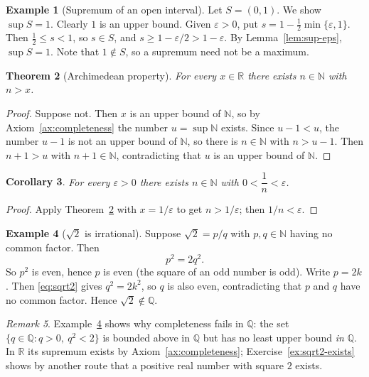 \documentclass[11pt,a4paper]{book}
\newcommand{\N}{\mathbb{N}}
\newcommand{\Q}{\mathbb{Q}}
\newcommand{\R}{\mathbb{R}}
\numberwithin{equation}{section}          %
\theoremstyle{plain}
\newtheorem{theorem}{Theorem}[section]    %
\newtheorem{corollary}[theorem]{Corollary}
\theoremstyle{definition}
\newtheorem{example}[theorem]{Example}
\theoremstyle{remark}
\newtheorem{remark}[theorem]{Remark}
\begin{document}
\begin{example}[Supremum of an open interval]\label{ex:sup-interval}
Let $S=(0,1)$. We show $\sup S=1$. Clearly $1$ is an upper bound. Given $\varepsilon>0$, put $s=1-\tfrac12\min\{\varepsilon,1\}$. Then $\tfrac12\le s<1$, so $s\in S$, and $s\ge 1-\varepsilon/2>1-\varepsilon$. By Lemma~\ref{lem:sup-eps}, $\sup S=1$. Note that $1\notin S$, so a supremum need not be a maximum.
\end{example}

\begin{theorem}[Archimedean property]\label{thm:archimedean}
For every $x\in\R$ there exists $n\in\N$ with $n>x$.
\end{theorem}

\begin{proof}
Suppose not. Then $x$ is an upper bound of $\N$, so by Axiom~\ref{ax:completeness} the number $u=\sup\N$ exists. Since $u-1<u$, the number $u-1$ is not an upper bound of $\N$, so there is $n\in\N$ with $n>u-1$. Then $n+1>u$ with $n+1\in\N$, contradicting that $u$ is an upper bound of $\N$.
\end{proof}

\begin{corollary}\label{cor:one-over-n}
For every $\varepsilon>0$ there exists $n\in\N$ with $0<\dfrac1n<\varepsilon$.
\end{corollary}

\begin{proof}
Apply Theorem~\ref{thm:archimedean} with $x=1/\varepsilon$ to get $n>1/\varepsilon$; then $1/n<\varepsilon$.
\end{proof}

\begin{example}[$\sqrt2$ is irrational]\label{ex:sqrt2}
Suppose $\sqrt2=p/q$ with $p,q\in\N$ having no common factor. Then
\begin{equation}\label{eq:sqrt2}
    p^2=2q^2 .
\end{equation}
So $p^2$ is even, hence $p$ is even (the square of an odd number is odd). Write $p=2k$. Then \eqref{eq:sqrt2} gives $q^2=2k^2$, so $q$ is also even, contradicting that $p$ and $q$ have no common factor. Hence $\sqrt2\notin\Q$.
\end{example}

\begin{remark}
Example~\ref{ex:sqrt2} shows why completeness fails in $\Q$: the set $\{q\in\Q: q>0,\ q^2<2\}$ is bounded above in $\Q$ but has no least upper bound \emph{in} $\Q$. In $\R$ its supremum exists by Axiom~\ref{ax:completeness}; Exercise~\ref{ex:sqrt2-exists} shows by another route that a positive real number with square $2$ exists.
\end{remark}
\end{document}

